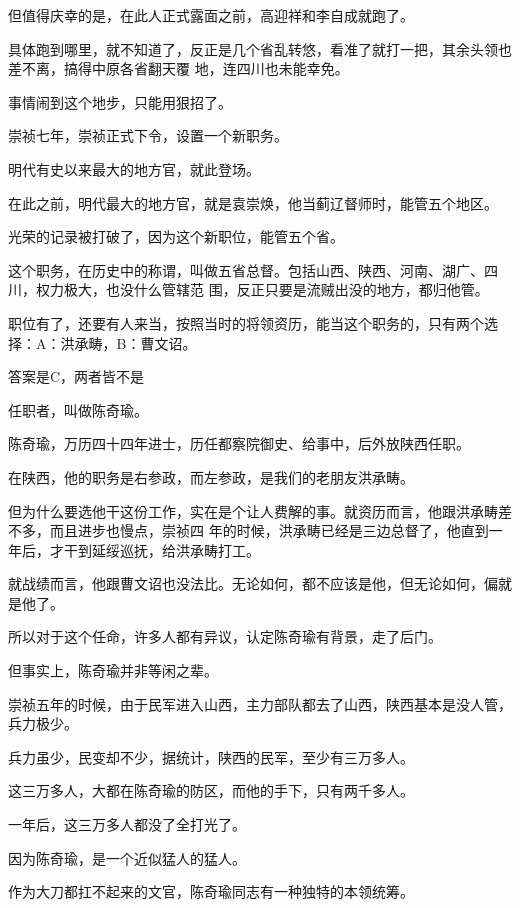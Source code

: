 \documentclass[11pt,a4paper,onecolumn]{article}
\begin{document}
但值得庆幸的是，在此人正式露面之前，高迎祥和李自成就跑了。

具体跑到哪里，就不知道了，反正是几个省乱转悠，看准了就打一把，其余头领也差不离，搞得中原各省翻天覆
地，连四川也未能幸免。

事情闹到这个地步，只能用狠招了。

崇祯七年，崇祯正式下令，设置一个新职务。

明代有史以来最大的地方官，就此登场。

在此之前，明代最大的地方官，就是袁崇焕，他当蓟辽督师时，能管五个地区。

光荣的记录被打破了，因为这个新职位，能管五个省。

这个职务，在历史中的称谓，叫做五省总督。包括山西、陕西、河南、湖广、四川，权力极大，也没什么管辖范
围，反正只要是流贼出没的地方，都归他管。

职位有了，还要有人来当，按照当时的将领资历，能当这个职务的，只有两个选择：A：洪承畴，B：曹文诏。

答案是C，两者皆不是

任职者，叫做陈奇瑜。

陈奇瑜，万历四十四年进士，历任都察院御史、给事中，后外放陕西任职。

在陕西，他的职务是右参政，而左参政，是我们的老朋友洪承畴。

但为什么要选他干这份工作，实在是个让人费解的事。就资历而言，他跟洪承畴差不多，而且进步也慢点，崇祯四
年的时候，洪承畴已经是三边总督了，他直到一年后，才干到延绥巡抚，给洪承畴打工。

就战绩而言，他跟曹文诏也没法比。无论如何，都不应该是他，但无论如何，偏就是他了。

所以对于这个任命，许多人都有异议，认定陈奇瑜有背景，走了后门。

但事实上，陈奇瑜并非等闲之辈。

崇祯五年的时候，由于民军进入山西，主力部队都去了山西，陕西基本是没人管，兵力极少。

兵力虽少，民变却不少，据统计，陕西的民军，至少有三万多人。

这三万多人，大都在陈奇瑜的防区，而他的手下，只有两千多人。

一年后，这三万多人都没了\myrule 全打光了。

因为陈奇瑜，是一个近似猛人的猛人。

作为大刀都扛不起来的文官，陈奇瑜同志有一种独特的本领\myrule 统筹。

\section[\thesection]{}
\end{document}
